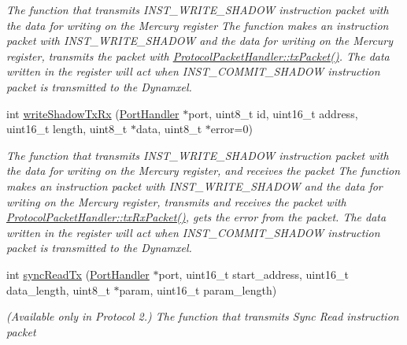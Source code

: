 \begin{DoxyCompactItemize}
\begin{DoxyCompactList}\small\item\em The function that transmits I\+N\+S\+T\+\_\+\+W\+R\+I\+T\+E\+\_\+\+S\+H\+A\+D\+OW instruction packet with the data for writing on the Mercury register  The function makes an instruction packet with I\+N\+S\+T\+\_\+\+W\+R\+I\+T\+E\+\_\+\+S\+H\+A\+D\+OW and the data for writing on the Mercury register,  transmits the packet with \hyperlink{classmercury_1_1_protocol_packet_handler_a245f01395d9684bc58788e8a06de3ffc}{Protocol\+Packet\+Handler\+::tx\+Packet()}.  The data written in the register will act when I\+N\+S\+T\+\_\+\+C\+O\+M\+M\+I\+T\+\_\+\+S\+H\+A\+D\+OW instruction packet is transmitted to the Dynamxel. \end{DoxyCompactList}\item 
int \hyperlink{classmercury_1_1_protocol_packet_handler_a822f9e0b679c26df080a9ae7a60e741c}{write\+Shadow\+Tx\+Rx} (\hyperlink{classmercury_1_1_port_handler}{Port\+Handler} $\ast$port, uint8\+\_\+t id, uint16\+\_\+t address, uint16\+\_\+t length, uint8\+\_\+t $\ast$data, uint8\+\_\+t $\ast$error=0)
\begin{DoxyCompactList}\small\item\em The function that transmits I\+N\+S\+T\+\_\+\+W\+R\+I\+T\+E\+\_\+\+S\+H\+A\+D\+OW instruction packet with the data for writing on the Mercury register, and receives the packet  The function makes an instruction packet with I\+N\+S\+T\+\_\+\+W\+R\+I\+T\+E\+\_\+\+S\+H\+A\+D\+OW and the data for writing on the Mercury register,  transmits and receives the packet with \hyperlink{classmercury_1_1_protocol_packet_handler_a68b02f23af616886d0795ea12debd613}{Protocol\+Packet\+Handler\+::tx\+Rx\+Packet()},  gets the error from the packet.  The data written in the register will act when I\+N\+S\+T\+\_\+\+C\+O\+M\+M\+I\+T\+\_\+\+S\+H\+A\+D\+OW instruction packet is transmitted to the Dynamxel. \end{DoxyCompactList}\item 
int \hyperlink{classmercury_1_1_protocol_packet_handler_af742b8964f4a2fed30b268a8c6434652}{sync\+Read\+Tx} (\hyperlink{classmercury_1_1_port_handler}{Port\+Handler} $\ast$port, uint16\+\_\+t start\+\_\+address, uint16\+\_\+t data\+\_\+length, uint8\+\_\+t $\ast$param, uint16\+\_\+t param\+\_\+length)
\begin{DoxyCompactList}\small\item\em (Available only in Protocol 2.) The function that transmits Sync Read instruction packet \end{DoxyCompactList}\item 

\end{DoxyCompactItemize}
